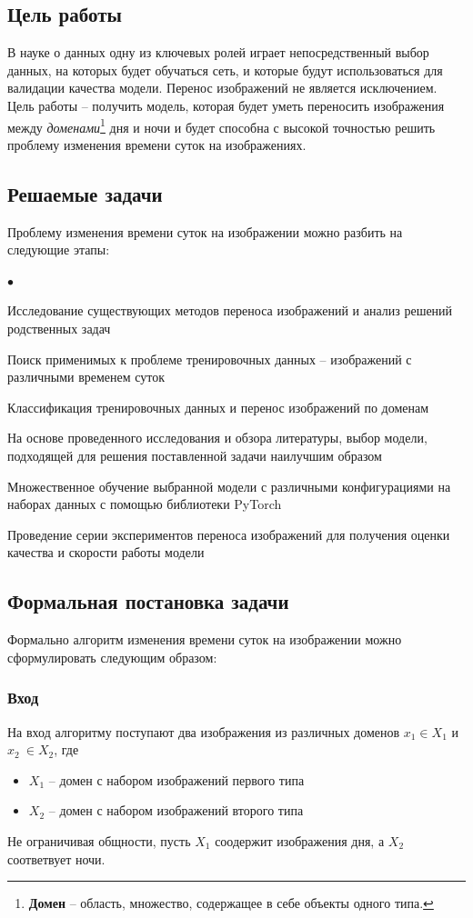 \documentclass[11pt,a4paper]{extarticle}
\newenvironment{compactlist}{
\begin{list}{{$\bullet$}}{
\setlength\partopsep{0pt}
\setlength\parskip{0pt}
\setlength\parsep{0pt}
\setlength\topsep{0pt}
\setlength\itemsep{0pt}
}}{
\end{list}
}
\begin{document}
	\subsection{Цель работы}
		В науке о данных одну из ключевых ролей играет непосредственный выбор данных, на которых будет обучаться сеть, 
		и которые будут использоваться для валидации качества модели. Перенос изображений не является исключением.
		Цель работы -- получить модель, которая будет уметь переносить изображения между \textit{доменами}\footnote{
			\textbf{Домен} -- область, множество, содержащее в себе объекты одного типа. 
		} дня и ночи и будет способна с высокой точностью решить проблему изменения времени суток на изображениях.

	\subsection{Решаемые задачи}
		Проблему изменения времени суток на изображении можно разбить на следующие этапы:

		\begin{compactlist}
			\item Исследование существующих методов переноса изображений и анализ решений родственных задач
			\item Поиск применимых к проблеме тренировочных данных -- изображений с различными временем суток
			\item Классификация тренировочных данных и перенос изображений по доменам 
			\item На основе проведенного исследования и обзора литературы, выбор модели, подходящей для решения поставленной задачи
			наилучшим образом
			\item Множественное обучение выбранной модели с различными конфигурациями на наборах данных с помощью библиотеки PyTorch
			\item Проведение серии экспериментов переноса изображений для получения оценки качества и скорости работы модели 
		\end{compactlist}

	\subsection{Формальная постановка задачи}\label{intro_problem}
		Формально алгоритм изменения времени суток на изображении можно сформулировать следующим образом:
		\vspace{-1em}
		\subsubsection*{Вход}
			На вход алгоритму поступают два изображения из различных доменов \(x_{1} \in X_{1}\)  и \(x_{2}\ \in X_{2}\), где
			\begin{itemize}
				\item \(X_{1}\) -- домен с набором изображений первого типа
				\item \(X_{2}\) -- домен с набором изображений второго типа
			\end{itemize}
			Не ограничивая общности, пусть \(X_{1}\) соодержит изображения дня, а \(X_{2}\) соответвует ночи.
		\vspace{-1em}
\end{document}
